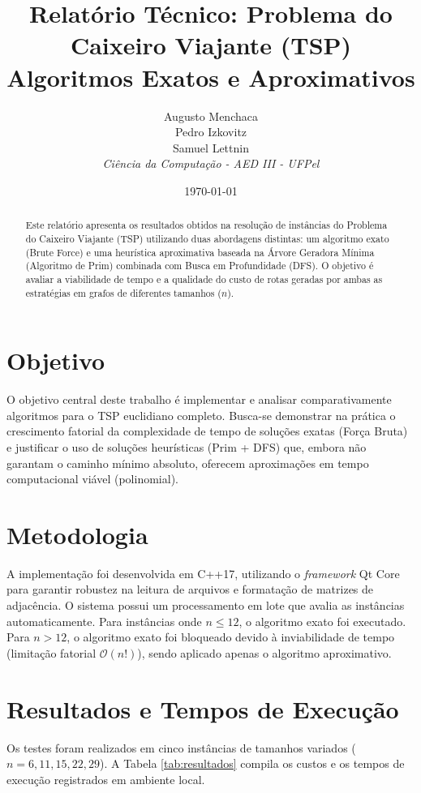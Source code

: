 \documentclass[12pt,a4paper]{article}
\title{\textbf{Relatório Técnico: Problema do Caixeiro Viajante (TSP)}\\
\large Algoritmos Exatos e Aproximativos}
\author{
    Augusto Menchaca \\
    Pedro Izkovitz \\
    Samuel Lettnin \\
    \textit{Ciência da Computação - AED III - UFPel}
}
\date{\today}
\begin{document}
\maketitle

\begin{abstract}
Este relatório apresenta os resultados obtidos na resolução de instâncias do Problema do Caixeiro Viajante (TSP) utilizando duas abordagens distintas: um algoritmo exato (Brute Force) e uma heurística aproximativa baseada na Árvore Geradora Mínima (Algoritmo de Prim) combinada com Busca em Profundidade (DFS). O objetivo é avaliar a viabilidade de tempo e a qualidade do custo de rotas geradas por ambas as estratégias em grafos de diferentes tamanhos ($n$).
\end{abstract}

\section{Objetivo}
O objetivo central deste trabalho é implementar e analisar comparativamente algoritmos para o TSP euclidiano completo. Busca-se demonstrar na prática o crescimento fatorial da complexidade de tempo de soluções exatas (Força Bruta) e justificar o uso de soluções heurísticas (Prim + DFS) que, embora não garantam o caminho mínimo absoluto, oferecem aproximações em tempo computacional viável (polinomial).

\section{Metodologia}
A implementação foi desenvolvida em C++17, utilizando o \textit{framework} Qt Core para garantir robustez na leitura de arquivos e formatação de matrizes de adjacência. O sistema possui um processamento em lote que avalia as instâncias automaticamente. 
Para instâncias onde $n \le 12$, o algoritmo exato foi executado. Para $n > 12$, o algoritmo exato foi bloqueado devido à inviabilidade de tempo (limitação fatorial $\mathcal{O}(n!)$), sendo aplicado apenas o algoritmo aproximativo.

\section{Resultados e Tempos de Execução}
Os testes foram realizados em cinco instâncias de tamanhos variados ($n = 6, 11, 15, 22, 29$). A Tabela \ref{tab:resultados} compila os custos e os tempos de execução registrados em ambiente local.
\end{document}
